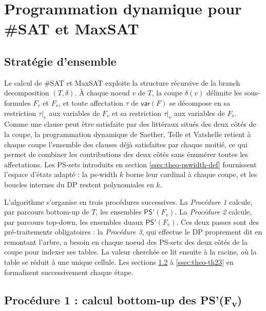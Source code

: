 \documentclass[11pt,a4paper]{report}
\theoremstyle{plain}
\theoremstyle{definition}
\begin{document}
\section{Programmation dynamique pour \#SAT et MaxSAT}
\label{sec:theo-dp}

\subsection{Stratégie d'ensemble}
\label{ssec:theo-dp-strategy}

Le calcul de \#SAT et MaxSAT exploite la structure récursive de la
branch decomposition $(T, \delta)$. À chaque noeud $v$ de $T$, la coupe
$\delta(v)$ délimite les sous-formules $F_v$ et $F_{\overline{v}}$, et
toute affectation $\tau$ de $\mathsf{var}(F)$ se décompose en sa
restriction $\tau|_v$ aux variables de $F_v$ et sa restriction
$\tau|_{\overline{v}}$ aux variables de $F_{\overline{v}}$. Comme une
clause peut être satisfaite par des littéraux situés des deux côtés de
la coupe, la programmation dynamique de Saether, Telle et
Vatshelle \cite{saether2015} retient à chaque coupe l'ensemble des
clauses déjà satisfaites par chaque moitié, ce qui permet de combiner
les contributions des deux côtés sans énumérer toutes les
affectations. Les PS-sets introduits en
section \ref{ssec:theo-pswidth-def} fournissent l'espace d'états
adapté : la ps-width $k$ borne leur cardinal à chaque coupe, et les
boucles internes du DP restent polynomiales en $k$.

L'algorithme s'organise en trois procédures successives. La
\emph{Procédure 1} calcule, par parcours bottom-up de $T$, les
ensembles $\mathsf{PS}'(F_v)$. La \emph{Procédure 2} calcule, par
parcours top-down, les ensembles duaux
$\mathsf{PS}'(F_{\overline{v}})$. Ces deux passes sont des
pré-traitements obligatoires : la \emph{Procédure 3}, qui effectue le
DP proprement dit en remontant l'arbre, a besoin en chaque noeud des
PS-sets des deux côtés de la coupe pour indexer ses tables. La valeur
cherchée se lit ensuite à la racine, où la table se réduit à une
unique cellule. Les sections \ref{ssec:theo-proc1}
à \ref{ssec:theo-th23} en formalisent successivement chaque étape.

\subsection{Procédure 1 : calcul bottom-up des PS'(F\textsubscript{v})}
\label{ssec:theo-proc1}
\end{document}
